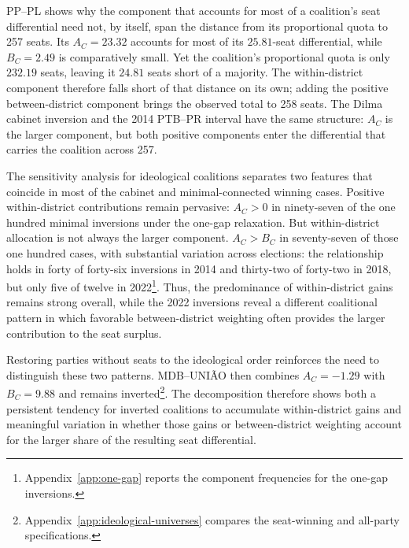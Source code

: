 \documentclass[11pt]{article}
\begin{document}
PP--PL shows why the component that accounts for most of a coalition's
seat differential need not, by itself, span the distance from its proportional
quota to 257 seats. Its \(A_C=23.32\) accounts for most of its
\(25.81\)-seat differential, while \(B_C=2.49\) is comparatively small.
Yet the coalition's proportional quota is only \(232.19\) seats, leaving
it \(24.81\) seats short of a majority. The within-district component
therefore falls short of that distance on its own; adding the positive
between-district component brings the observed total to 258 seats. The
Dilma cabinet inversion and the 2014 PTB--PR interval have the same
 structure: \(A_C\) is the larger component, but both positive
components enter the differential that carries the coalition across 257.

The sensitivity analysis for ideological coalitions separates two features that
coincide in most of the cabinet and minimal-connected winning cases. Positive
within-district contributions remain pervasive: \(A_C>0\) in ninety-seven of the
one hundred minimal inversions under the one-gap relaxation. But within-district
allocation is not always the larger component. \(A_C>B_C\) in seventy-seven of
those one hundred cases, with substantial variation across elections: the
relationship holds in forty of forty-six inversions in 2014 and thirty-two of
forty-two in 2018, but only five of twelve in 2022\footnote{
  Appendix~\ref{app:one-gap} reports the component frequencies for the one-gap
  inversions.}. Thus, the predominance of within-district gains remains strong
overall, while the 2022 inversions reveal a different coalitional pattern in
which favorable between-district weighting often provides the larger
contribution to the seat surplus.

Restoring parties without seats to the ideological order reinforces the
need to distinguish these two patterns. MDB--UNIÃO then combines
\(A_C=-1.29\) with \(B_C=9.88\) and remains inverted\footnote{
Appendix~\ref{app:ideological-universes} compares the
seat-winning and all-party specifications.}. The decomposition therefore
shows both a persistent tendency for inverted coalitions to accumulate
within-district gains and meaningful variation in whether those gains or
between-district weighting account for the larger share of the resulting
seat differential.

\end{document}
